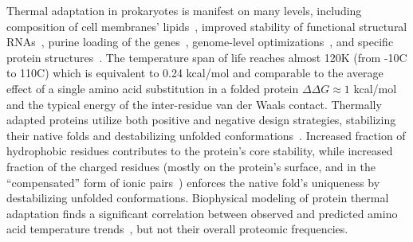 \documentclass[10pt,letterpaper]{article}
\begin{document}
Thermal adaptation in prokaryotes is manifest on many levels, including composition of cell membranes' lipids~\cite{Chugunov2014Liquid},  improved stability of functional structural RNAs~\cite{Galtier1997Relationships}, purine loading of the genes~\cite{Lambros2003Optimum},  genome-level optimizations~\cite{Sabath2013Growth,Saha2015Overlapping},  and specific protein structures~\cite{Szilagyi2000Structural,England2003Natural}. The temperature span of life reaches almost 120K (from -10\textdegree C to 110\textdegree C) which is equivalent to 0.24 kcal/mol and comparable to the average effect of a single amino acid substitution in a folded protein $\Delta\Delta G\approx 1$ kcal/mol~\cite{Zeldovich2007Proteinb} and the typical energy of the inter-residue van der Waals contact. Thermally adapted proteins utilize both positive and negative design strategies, stabilizing their native folds and destabilizing unfolded conformations~\cite{Berezovsky2007Positive}. Increased fraction of hydrophobic residues contributes to the protein's core stability, while increased fraction of the charged residues (mostly on the protein's surface, and in the ``compensated'' form of ionic pairs~\cite{Szilagyi2000Structural}) enforces the native fold's uniqueness by destabilizing unfolded conformations.  Biophysical modeling of protein thermal adaptation finds a significant correlation between observed and predicted amino acid temperature trends~\cite{Berezovsky2007Positive,Venev2015Massively}, but not their overall proteomic frequencies. 

\end{document}
